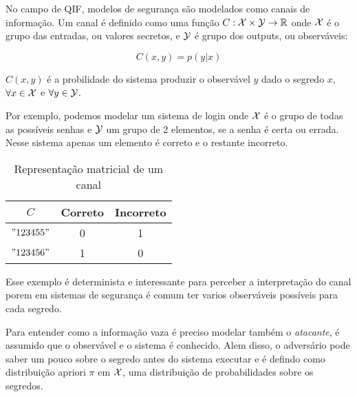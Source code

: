
% 

No campo de QIF, modelos de segurança são modelados como canais de informação. Um canal é definido como uma função $C: \mathcal{X} \times \mathcal{Y} \rightarrow \mathbb{R}$ onde $\mathcal{X}$ é o grupo das entradas, ou valores secretos, e $\mathcal{Y}$ é grupo dos outputs, ou observáveis:

$$ C(x,y) = p(y|x) $$

$C(x,y)$ é a probilidade do sistema produzir o observável $y$ dado o segredo $x$, $\forall x \in \mathcal{X}$ e $\forall y \in \mathcal{Y}$.

Por exemplo, podemos modelar um sistema de login onde $\mathcal{X}$ é o grupo de todas as possíveis senhas e $\mathcal{Y}$ um grupo de 2 elementos, se a senha é certa ou errada. Nesse sistema apenas um elemento é correto e o restante incorreto.
\begin{table}[h!]
\centering
\begin{tabular}{|c|c c|}
    \hline
    $C$   & Correto & Incorreto  \\
    \hline 
    $"123455"$&0&1\\
    $"123456"$&1&0\\
    \hline
\end{tabular}
\caption{Representação matricial de um canal}
\label{Tabela:1}
\end{table}
Esse exemplo é determinista e interessante para perceber a interpretação do canal porem em sistemas de segurança é comum ter varios observáveis possíveis para cada segredo.

Para entender como a informação vaza é preciso modelar também o \emph{atacante}, é assumido que o observável e o sistema é conhecido. Alem disso, o adversário pode saber um pouco sobre o segredo antes do sistema executar e é defindo como distribuição apriori $\pi$ em $\mathcal{X}$, uma distribuição de probabilidades sobre os segredos. 




